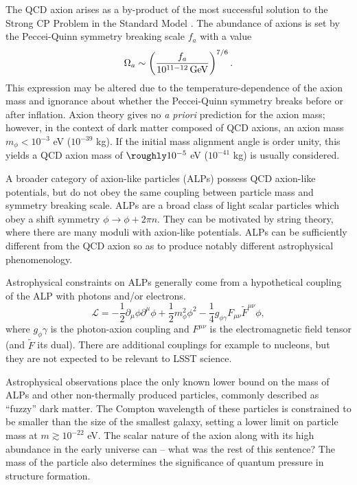 The QCD axion arises as a by-product of the most successful solution to the Strong CP Problem in the Standard Model \citep{PecceiQuinn:1977}. 
The abundance of axions is set by the Peccei-Quinn symmetry breaking scale $f_a$ with a value
\begin{equation}
\Omega_a\sim\left(\frac{f_a}{10^{11-12}\,{\rm GeV}}\right)^{7/6}.
\end{equation}
This expression may be altered due to the temperature-dependence of the axion mass and ignorance about whether the Peccei-Quinn symmetry breaks before or after inflation. 
Axion theory gives no {\it a priori} prediction for the axion mass; however, in the context of dark matter composed of QCD axions, an axion mass $m_\phi< 10^{-3}$ eV ($10^{-39}$ kg). 
If the initial mass alignment angle is order unity, this yields a QCD axion mass of $\roughly 10^{-5}$ eV ($10^{-41}$ kg) is usually considered.  

A broader category of axion-like particles (ALPs) possess QCD axion-like potentials, but do not obey the same coupling between particle mass and symmetry breaking scale. ALPs are a broad class of light scalar particles which obey a shift symmetry $\phi \rightarrow \phi + 2\pi n$. They can be motivated by string theory, where there are many moduli with axion-like potentials. ALPs can be sufficiently different from the QCD axion so as to produce notably different astrophysical phenomenology. 

Astrophysical constraints on ALPs generally come from a hypothetical coupling of the ALP with photons and/or electrons. 
\begin{equation}
    \mathcal{L} = -\frac{1}{2} \partial_\mu\phi\partial^\mu\phi + \frac{1}{2}m_\phi^2 \phi^2 - \frac{1}{4}g_{\phi\gamma}F_{\mu\nu}\tilde{F}^{\mu\nu}\phi,
\end{equation}
where $g_\phi\gamma$ is the photon-axion coupling and $F^{\mu\nu}$ is the electromagnetic field tensor (and $\tilde{F}$ its dual). There are additional couplings for example to nucleons, but they are not expected to be relevant to LSST science.  

Astrophysical observations place the only known lower bound on the mass of ALPs and other non-thermally produced particles, commonly described as ``fuzzy'' dark matter. The Compton wavelength of these particles is constrained to be smaller than the size of the smallest galaxy, setting a lower limit on particle mass at $m \gtrsim 10^{-22}$ eV. The scalar nature of the axion along with its high abundance in the early universe can -- what was the rest of this sentence? The mass of the particle also determines the significance of quantum pressure in structure formation.



